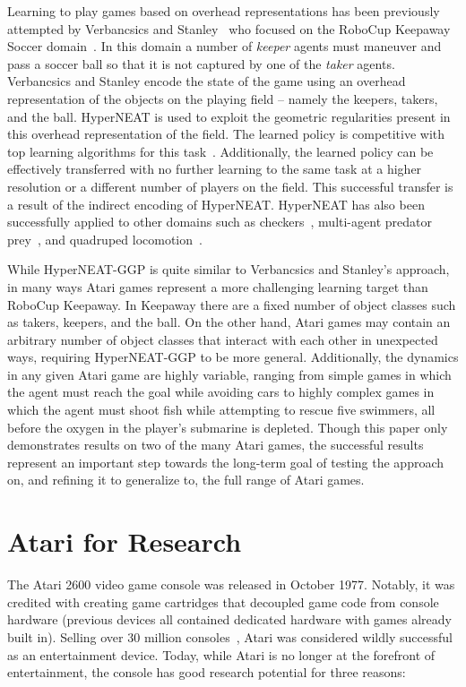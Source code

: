 \documentclass{sig-alternate}
\begin{document}
Learning to play games based on overhead representations has been previously attempted by Verbancsics and Stanley~\cite{verbancsics10} who focused on the RoboCup Keepaway Soccer domain~\cite{stone01}. In this domain a number of \textit{keeper} agents must maneuver and pass a soccer ball so that it is not captured by one of the \textit{taker} agents. Verbancsics and Stanley encode the state of the game using an overhead representation of the objects on the playing field -- namely the keepers, takers, and the ball. HyperNEAT is used to exploit the geometric regularities present in this overhead representation of the field.  The learned policy is competitive with top learning algorithms for this task~\cite{stone05}. Additionally, the learned policy can be effectively transferred with no further learning to the same task at a higher resolution or a different number of players on the field. This successful transfer is a result of the indirect encoding of HyperNEAT. HyperNEAT has also been successfully applied to other domains such as checkers~\cite{gauci08}, multi-agent predator prey~\cite{ambrosio08}, and quadruped locomotion~\cite{clune09}. 

While HyperNEAT-GGP is quite similar to Verbancsics and Stanley's approach, in many ways Atari games represent a more challenging learning target than RoboCup Keepaway. In Keepaway there are a fixed number of object classes such as takers, keepers, and the ball. On the other hand, Atari games may contain an arbitrary number of object classes that interact with each other in unexpected ways, requiring HyperNEAT-GGP to be more general. Additionally, the dynamics in any given Atari game are highly variable, ranging from simple games in which the agent must reach the goal while avoiding cars to highly complex games in which the agent must shoot fish while attempting to rescue five swimmers, all before the oxygen in the player's submarine is depleted. Though this paper only demonstrates results on two of the many Atari games, the successful results represent an important step towards the long-term goal of testing the approach on, and refining it to generalize to, the full range of Atari games.

\section{Atari for Research}
\label{sec:atari}
The Atari 2600 video game console was released in October 1977. Notably, it was credited with creating game cartridges that decoupled game code from console hardware (previous devices all contained dedicated hardware with games already built in). Selling over 30 million consoles~\cite{atarihist}, Atari was considered wildly successful as an entertainment device. Today, while Atari is no longer at the forefront of entertainment, the console has good research potential for three reasons:
\end{document}
